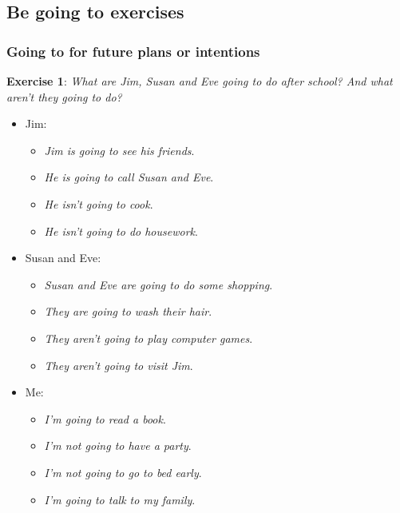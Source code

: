 \subsection{Be going to exercises}

\subsubsection{Going to for future plans or intentions}

\textbf{Exercise 1}: \textit{What are Jim, Susan and Eve going to do after school? And what aren't they going to do?}

\begin{itemize}

\item Jim:

\begin{itemize}

\item \textit{Jim is going to see his friends}.
\item \textit{He is going to call Susan and Eve}.
\item \textit{He isn't going to cook}.
\item \textit{He isn't going to do housework}.

\end{itemize}

\item Susan and Eve:

\begin{itemize}

\item \textit{Susan and Eve are going to do some shopping}.
\item \textit{They are going to wash their hair}.
\item \textit{They aren't going to play computer games}.
\item \textit{They aren't going to visit Jim}.

\end{itemize}

\item Me:

\begin{itemize}

\item \textit{I'm going to read a book}.
\item \textit{I'm not going to have a party}.
\item \textit{I'm not going to go to bed early}.
\item \textit{I'm going to talk to my family}.

\end{itemize}

\end{itemize}

